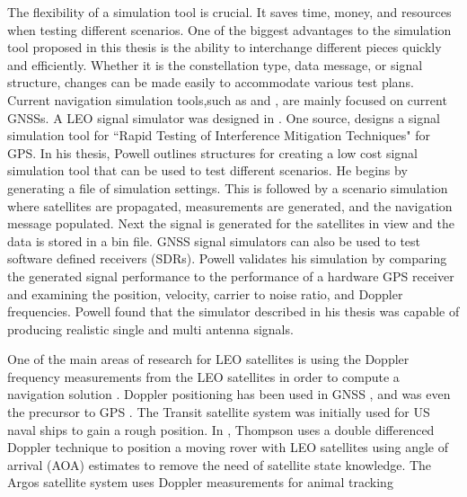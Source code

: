 \documentclass[12pt]{report}
\begin{document}
The flexibility of a simulation tool is crucial. It saves time, money, and resources when testing different scenarios. One of the biggest advantages to the simulation tool proposed in this thesis is the ability to interchange different pieces quickly and efficiently. Whether it is the constellation type, data message, or signal structure, changes can be made easily to accommodate various test plans. Current navigation simulation tools,such as \cite{dongIFGPSSignal2003} and \cite{corbellDesignValidationAccurate2000}, are mainly focused on current GNSSs. A LEO signal simulator was designed in \cite{samuel_mcdougal_single-antenna_2022}. One source, \cite{powellMultipleAntennaSoftwareGPS} designs a signal simulation tool for ``Rapid Testing of Interference Mitigation Techniques" for GPS. In his thesis, Powell outlines structures for creating a low cost signal simulation tool that can be used to test different scenarios. He begins by generating a file of simulation settings. This is followed by a scenario simulation where satellites are propagated, measurements are generated, and the navigation message populated. Next the signal is generated for the satellites in view and the data is stored in a bin file. GNSS signal simulators can also be used to test software defined receivers (SDRs). Powell validates his simulation by comparing the generated signal performance to the performance of a hardware GPS receiver and examining the position, velocity, carrier to noise ratio, and Doppler frequencies. Powell found that the simulator described in his thesis was capable of producing realistic single and multi antenna signals. 


One of the main areas of research for LEO satellites is using the Doppler frequency measurements from the LEO satellites in order to compute a navigation solution \cite{hsuAssessmentUsingDoppler2014} \cite{psiakiNavigationUsingCarrier2021}. Doppler positioning has been used in GNSS \cite{bahramiGNSSDopplerPositioning}, and was even the precursor to GPS \cite{TransitSatelliteSpacebased}. The Transit satellite system was initially used for US naval ships to gain a rough position. In \cite{thompsonSingleDifferencedDoppler2021}, Thompson uses a double differenced Doppler technique to position a moving rover with LEO satellites using angle of arrival (AOA) estimates to remove the need of satellite state knowledge. The Argos satellite system uses Doppler measurements for animal tracking \cite{lopezImprovingArgosDoppler2014}
  
\end{document}
